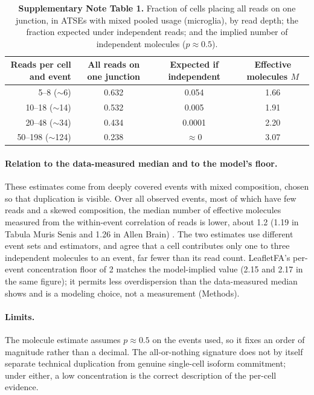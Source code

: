 \begin{table}[h]
\centering
\small
\begin{tabular}{rccc}
\hline
\textbf{Reads per cell and event} & \textbf{All reads on one junction} & \textbf{Expected if independent} & \textbf{Effective molecules $M$} \\
\hline
5--8 ($\sim$6)       & 0.632 & 0.054   & 1.66 \\
10--18 ($\sim$14)    & 0.532 & 0.005   & 1.91 \\
20--48 ($\sim$34)    & 0.434 & 0.0001  & 2.20 \\
50--198 ($\sim$124)  & 0.238 & $\approx$0 & 3.07 \\
\hline
\end{tabular}
\caption*{\textbf{Supplementary Note Table 1.} Fraction of cells placing all reads on one junction, in ATSEs
with mixed pooled usage (microglia), by read depth; the fraction expected under independent reads; and the
implied number of independent molecules ($p \approx 0.5$).}
\end{table}

\paragraph{Relation to the data-measured median and to the model's floor.} These estimates come from deeply
covered events with mixed composition, chosen so that duplication is visible. Over all observed events,
most of which have few reads and a skewed composition, the median number of effective molecules measured
from the within-event correlation of reads is lower, about 1.2 (1.19 in Tabula Muris Senis and 1.26 in Allen
Brain) \cite{SpliceVI2026}. The two estimates use different event sets and estimators, and agree that a cell
contributes only one to three independent molecules to an event, far fewer than its read count. LeafletFA's
per-event concentration floor of 2 matches the model-implied value (2.15 and 2.17 in the same figure); it
permits less overdispersion than the data-measured median shows and is a modeling choice, not a
measurement (Methods).

\paragraph{Limits.} The molecule estimate assumes $p \approx 0.5$ on the events used, so it fixes an order of
magnitude rather than a decimal. The all-or-nothing signature does not by itself separate technical
duplication from genuine single-cell isoform commitment; under either, a low concentration is the correct
description of the per-cell evidence.
